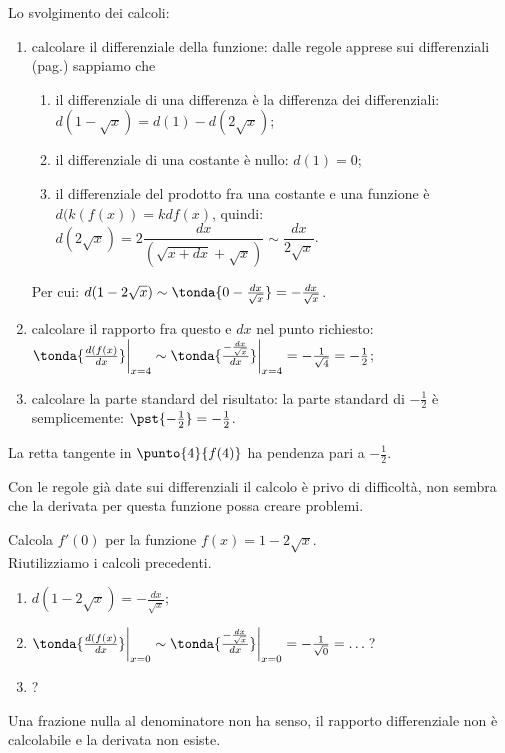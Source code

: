 \begin{esempio}
Lo svolgimento dei calcoli:
\begin{enumerate} [noitemsep]
 \item calcolare il differenziale della funzione: dalle regole apprese 
  sui differenziali (pag.\pageref{subsubsec:diff01_diffradq}) sappiamo che
  \begin{enumerate} [noitemsep]
   \item il differenziale di una differenza è la differenza dei 
   differenziali:\\
    $d(1-\sqrt{x})=d(1)-d(2\sqrt{x})$;
   \item il differenziale di una costante è nullo: $d(1)=0$;
   \item il differenziale del prodotto fra una costante e una funzione è
   $d(k(f(x))=kdf(x)$, quindi: $d(2\sqrt{x})=
   2\dfrac{dx}{(\sqrt{x+dx}+\sqrt{x})}\sim \dfrac{dx}{2\sqrt{x}}$. 
  \end{enumerate} 
  Per cui: $d(1-2\sqrt{x})\sim\tonda{0-\frac{dx}{\sqrt{x}}}=
  -\frac{dx}{\sqrt{x}}$.
 \item calcolare il rapporto fra questo e $dx$ nel punto richiesto:\\
  $\tonda{\frac{d(f(x)}{dx}}\bigg|_{x=4}\sim
  \tonda{\frac{-\frac{dx}{\sqrt{x}}}{dx}}\bigg|_{x=4}=-\frac{1}{\sqrt{4}}=
  -\frac{1}{2}$;
 \item calcolare la parte standard del risultato: 
  la parte standard di $-\frac{1}{2}$ è
  semplicemente: $\pst{-\frac{1}{2}}=-\frac{1}{2}$.
\end{enumerate}
La retta tangente in $\punto{4}{f(4)}$ ha pendenza pari a $-\frac{1}{2}$.
\end{esempio}

Con le regole già date sui differenziali il calcolo è privo di difficoltà, 
non sembra che la derivata per questa funzione possa creare problemi.

\begin{esempio}
  \label{esempio:diff01_deriradice}
Calcola $f'(0)$ per la funzione $f(x)=1-2\sqrt{x}$.\\
Riutilizziamo i calcoli precedenti.
\begin{enumerate} [noitemsep]
 \item $d(1-2\sqrt{x})=-\frac{dx}{\sqrt{x}}$;
 \item $\tonda{\frac{d(f(x)}{dx}}\bigg|_{x=0}\sim
  \tonda{\frac{-\frac{dx}{\sqrt{x}}}{dx}}\bigg|_{x=0}=-\frac{1}{\sqrt{0}}=
  \dots$?
 \item ?
\end{enumerate}
Una frazione nulla al denominatore non ha senso, il rapporto differenziale 
non è calcolabile e la derivata non esiste. 
\end{esempio}


